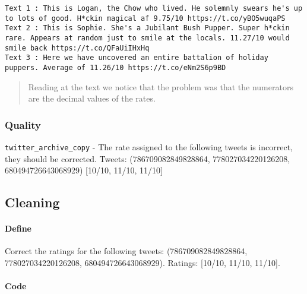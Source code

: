 \documentclass[11pt]{article}
\begin{document}
    \begin{Verbatim}[commandchars=\\\{\}]
Text 1 : This is Logan, the Chow who lived. He solemnly swears he's up to lots of good. H*ckin magical af 9.75/10 https://t.co/yBO5wuqaPS
Text 2 : This is Sophie. She's a Jubilant Bush Pupper. Super h*ckin rare. Appears at random just to smile at the locals. 11.27/10 would smile back https://t.co/QFaUiIHxHq
Text 3 : Here we have uncovered an entire battalion of holiday puppers. Average of 11.26/10 https://t.co/eNm2S6p9BD

    \end{Verbatim}

    \begin{quote}
Reading at the text we notice that the problem was that the numerators
are the decimal values of the rates.
\end{quote}

    \subsubsection{Quality}\label{quality}

\texttt{twitter\_archive\_copy} - The rate assigned to the following
tweets is incorrect, they should be corrected. Tweets:
(786709082849828864, 778027034220126208, 680494726643068929) {[}10/10,
11/10, 11/10{]}

    \subsection{Cleaning}\label{cleaning}

    \paragraph{Define}\label{define}

Correct the ratings for the following tweets: (786709082849828864,
778027034220126208, 680494726643068929). Ratings: {[}10/10, 11/10,
11/10{]}.

    \paragraph{Code}\label{code}
\end{document}

